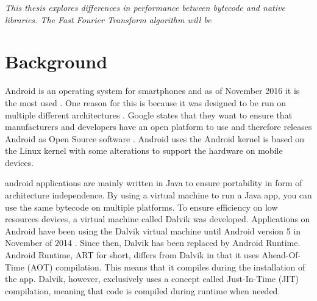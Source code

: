 
\textit{This thesis explores differences in performance between bytecode and native libraries. The Fast Fourier Transform algorithm will be }


\section{Background}
Android is an operating system for smartphones and as of November 2016 it is the most used \cite{android:os:popularity}. One reason for this is because it was designed to be run on multiple different architectures \cite{android:os:devices}. Google states that they want to ensure that manufacturers and developers have an open platform to use and therefore releases Android as Open Source software \cite{android:os:opensource}. Android uses the Android kernel is based on the Linux kernel with some alterations to support the hardware on mobile devices.


\gls{android} applications are mainly written in Java to ensure portability in form of architecture independence. By using a virtual machine to run a Java app, you can use the same bytecode on multiple platforms. To ensure efficiency on low resources devices, a virtual machine called Dalvik was developed. Applications on Android have been using the Dalvik virtual machine until Android version 5 \cite{android:dalvik} in November of 2014 \cite{android:dalvik:release}. Since then, Dalvik has been replaced by Android Runtime. Android Runtime, ART for short, differs from Dalvik in that it uses Ahead-Of-Time (AOT) compilation. This means that it compiles during the installation of the app. Dalvik, however, exclusively uses a concept called Just-In-Time (JIT) compilation, meaning that code is compiled during runtime when needed.


